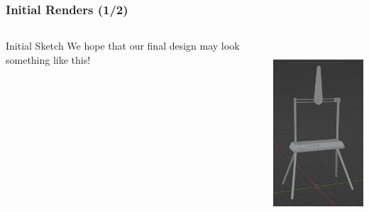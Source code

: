 \documentclass{beamer}
\begin{document}
\begin{frame}
\frametitle{Initial Renders (1/2)}

\begin{columns}
    \begin{column}{0.48\textwidth}
        \begin{block}{Initial Sketch}
            We hope that our final design may look something like this!
        \end{block}
    \end{column}
    \begin{column}{0.48\textwidth}
        \includegraphics[height=7cm]{Full}
    \end{column}
\end{columns}

\end{frame}
\end{document}
